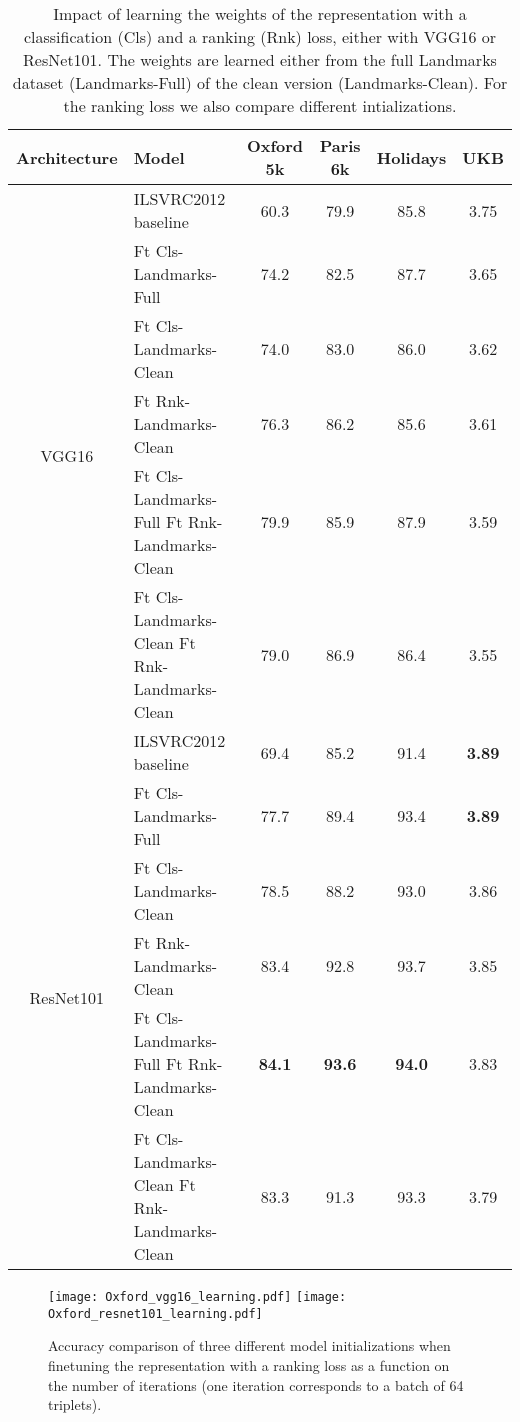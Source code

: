 \documentclass[twocolumn]{svjour3}          \smartqed  \usepackage{graphicx}
\begin{document}
\begin{table*}[t!]
    \caption{Impact of learning the weights of the representation with a classification (Cls) and a ranking (Rnk) loss, either with VGG16 or ResNet101. The weights are learned either from the full Landmarks dataset (Landmarks-Full) of the clean version (Landmarks-Clean). For the ranking loss we also compare different intializations.}
\centering
\begin{tabular}{clcccc}
\toprule
Architecture & Model & Oxford 5k & Paris 6k & Holidays & UKB \\
\midrule
\multirow{6}{*}{VGG16} & ILSVRC2012 baseline & 60.3 & 79.9 & 85.8 & 3.75 \\
\cline{2-6} 
    & Ft Cls-Landmarks-Full & 74.2 & 82.5  & 87.7 & 3.65 \\
    & Ft Cls-Landmarks-Clean & 74.0 & 83.0 & 86.0 & 3.62 \\
\cline{2-6} 
    & Ft Rnk-Landmarks-Clean & 76.3 & 86.2 & 85.6 & 3.61   \\
    & Ft Cls-Landmarks-Full   Ft Rnk-Landmarks-Clean & 79.9 & 85.9 & 87.9 & 3.59 \\
    & Ft Cls-Landmarks-Clean   Ft Rnk-Landmarks-Clean & 79.0 & 86.9 & 86.4 & 3.55  \\
\midrule
\multirow{6}{*}{ResNet101} & ILSVRC2012 baseline & 69.4 & 85.2 & 91.4 & \textbf{3.89} \\
\cline{2-6} 
    & Ft Cls-Landmarks-Full & 77.7 & 89.4 & 93.4 & \textbf{3.89} \\
    & Ft Cls-Landmarks-Clean  &  78.5  & 88.2 & 93.0 & 3.86  \\
\cline{2-6} 
    & Ft Rnk-Landmarks-Clean  & 83.4 & 92.8 & 93.7 & 3.85\\    
    & Ft Cls-Landmarks-Full   Ft Rnk-Landmarks-Clean & \textbf{84.1} & \textbf{93.6} & \textbf{94.0} & 3.83  \\
    & Ft Cls-Landmarks-Clean   Ft Rnk-Landmarks-Clean & 83.3 & 91.3 & 93.3 & 3.79  \\
\bottomrule
\end{tabular}
\label{tab:ml}
\end{table*}









\begin{figure}[t!]
\begin{centering}
\texttt{[image: Oxford\_vgg16\_learning.pdf]}
\texttt{[image: Oxford\_resnet101\_learning.pdf]}
\par\end{centering}
\caption{\label{fig:learning} Accuracy comparison of three different model initializations when finetuning the representation with a ranking loss as a function on the number of iterations (one iteration corresponds to a batch of 64 triplets).}
\end{figure}
\end{document}

